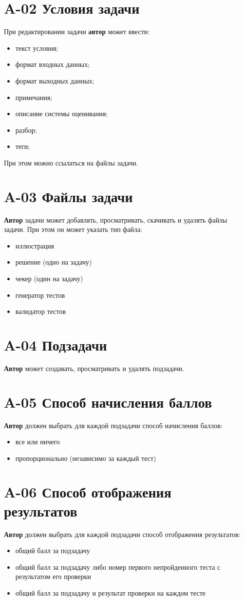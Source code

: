 \documentclass{book}
\newcommand{\newcard}[1]{\newpage \section*{#1}}
\begin{document}
\newcard{A-02 Условия задачи}
При редактировании задачи \textbf{автор} может ввести:
\begin{itemize}\setlength\itemsep{0pt}
	\item текст условия;
	\item формат входных данных;
	\item формат выходных данных;
	\item примечания;
	\item описание системы оценивания;
	\item разбор;
	\item теги;
\end{itemize}
При этом можно ссылаться на файлы задачи.


\newcard{A-03 Файлы задачи}
\textbf{Автор} задачи может добавлять, просматривать, скачивать и удалять файлы задачи. При этом он может указать тип файла:
\begin{itemize}\setlength{\itemsep}{0pt}
	\item иллюстрация
	\item решение (одно на задачу)
	\item чекер (один на задачу)
	\item генератор тестов
	\item валидатор тестов
\end{itemize}


\newcard{A-04 Подзадачи}
\textbf{Автор} может создавать, просматривать и удалять подзадачи. 


\newcard{A-05 Способ начисления баллов}
\textbf{Автор} должен выбрать для каждой подзадачи способ начисления баллов:
\begin{itemize}\setlength{\itemsep}{0pt}
	\item все или ничего
	\item пропорционально (независимо за каждый тест)
\end{itemize}


\newcard{A-06 Способ отображения результатов}
\textbf{Автор} должен выбрать для каждой подзадачи способ отображения результатов:
\begin{itemize}\setlength{\itemsep}{0pt}
	\item общий балл за подзадачу
	\item общий балл за подзадачу либо номер первого непройденного теста с результатом его проверки
	\item общий балл за подзадачу и результат проверки на каждом тесте
\end{itemize}
\end{document}
